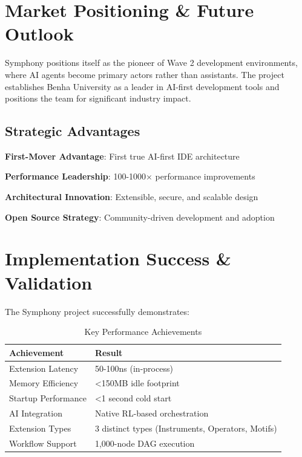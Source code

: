 \section*{Market Positioning \& Future Outlook}

Symphony positions itself as the pioneer of Wave 2 development environments, where AI agents become primary actors rather than assistants. The project establishes Benha University as a leader in AI-first development tools and positions the team for significant industry impact.

\subsection*{Strategic Advantages}
\begin{compactlist}
    \item \textbf{First-Mover Advantage}: First true AI-first IDE architecture
    \item \textbf{Performance Leadership}: 100-1000× performance improvements
    \item \textbf{Architectural Innovation}: Extensible, secure, and scalable design
    \item \textbf{Open Source Strategy}: Community-driven development and adoption
\end{compactlist}

\section*{Implementation Success \& Validation}

The Symphony project successfully demonstrates:

\begin{table}[ht]
\centering
\begin{tabular}{@{}ll@{}}
\toprule
\textbf{Achievement} & \textbf{Result} \\
\midrule
Extension Latency & 50-100ns (in-process) \\
Memory Efficiency & <150MB idle footprint \\
Startup Performance & <1 second cold start \\
AI Integration & Native RL-based orchestration \\
Extension Types & 3 distinct types (Instruments, Operators, Motifs) \\
Workflow Support & 1,000-node DAG execution \\
\bottomrule
\end{tabular}
\caption{Key Performance Achievements}
\end{table}

